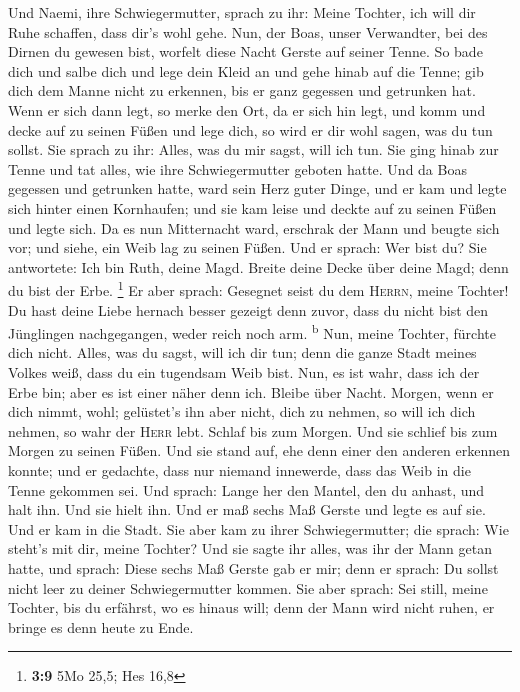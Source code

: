  Und Naemi, ihre Schwiegermutter, sprach zu ihr: Meine
Tochter, ich will dir Ruhe schaffen, dass dir's wohl gehe.
 Nun, der Boas, unser Verwandter, bei des Dirnen du
gewesen bist, worfelt diese Nacht Gerste auf seiner Tenne.
 So bade dich und salbe dich und lege dein Kleid an und
gehe hinab auf die Tenne; gib dich dem Manne nicht zu erkennen, bis er
ganz gegessen und getrunken hat.  Wenn er sich dann legt,
so merke den Ort, da er sich hin legt, und komm und decke auf zu seinen
Füßen und lege dich, so wird er dir wohl sagen, was du tun sollst.
 Sie sprach zu ihr: Alles, was du mir sagst, will ich tun.
 Sie ging hinab zur Tenne und tat alles, wie ihre
Schwiegermutter geboten hatte.  Und da Boas gegessen und
getrunken hatte, ward sein Herz guter Dinge, und er kam und legte sich
hinter einen Kornhaufen; und sie kam leise und deckte auf zu seinen
Füßen und legte sich.  Da es nun Mitternacht ward,
erschrak der Mann und beugte sich vor; und siehe, ein Weib lag zu seinen
Füßen.  Und er sprach: Wer bist du? Sie antwortete: Ich
bin Ruth, deine Magd. Breite deine Decke über deine Magd; denn du bist
der Erbe. \footnote{\textbf{3:9} 5Mo 25,5; Hes 16,8}  Er
aber sprach: Gesegnet seist du dem \textsc{Herrn}, meine Tochter! Du
hast deine Liebe hernach besser gezeigt denn zuvor, dass du nicht bist
den Jünglingen nachgegangen, weder reich noch arm. \textsuperscript{b}
 Nun, meine Tochter, fürchte dich nicht. Alles, was du
sagst, will ich dir tun; denn die ganze Stadt meines Volkes weiß, dass
du ein tugendsam Weib bist.  Nun, es ist wahr, dass ich
der Erbe bin; aber es ist einer näher denn ich.  Bleibe
über Nacht. Morgen, wenn er dich nimmt, wohl; gelüstet's ihn aber nicht,
dich zu nehmen, so will ich dich nehmen, so wahr der \textsc{Herr} lebt.
Schlaf bis zum Morgen.  Und sie schlief bis zum Morgen zu
seinen Füßen. Und sie stand auf, ehe denn einer den anderen erkennen
konnte; und er gedachte, dass nur niemand innewerde, dass das Weib in
die Tenne gekommen sei.  Und sprach: Lange her den
Mantel, den du anhast, und halt ihn. Und sie hielt ihn. Und er maß sechs
Maß Gerste und legte es auf sie. Und er kam in die Stadt.
 Sie aber kam zu ihrer Schwiegermutter; die sprach: Wie
steht's mit dir, meine Tochter? Und sie sagte ihr alles, was ihr der
Mann getan hatte,  und sprach: Diese sechs Maß Gerste gab
er mir; denn er sprach: Du sollst nicht leer zu deiner Schwiegermutter
kommen.  Sie aber sprach: Sei still, meine Tochter, bis
du erfährst, wo es hinaus will; denn der Mann wird nicht ruhen, er
bringe es denn heute zu Ende.

